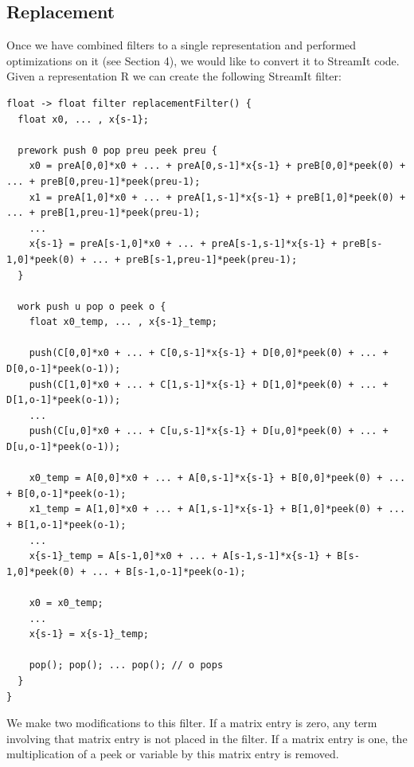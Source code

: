 \subsection{Replacement}

    Once we have combined filters to a single representation and
performed optimizations on it (see Section 4), we would like to
convert it to StreamIt code. Given a representation $\mathrm{R}$
we can create the following StreamIt filter:

\begin{scriptsize}
\begin{singlespace}
\begin{verbatim}
float -> float filter replacementFilter() {
  float x0, ... , x{s-1};

  prework push 0 pop preu peek preu {
    x0 = preA[0,0]*x0 + ... + preA[0,s-1]*x{s-1} + preB[0,0]*peek(0) + ... + preB[0,preu-1]*peek(preu-1);
    x1 = preA[1,0]*x0 + ... + preA[1,s-1]*x{s-1} + preB[1,0]*peek(0) + ... + preB[1,preu-1]*peek(preu-1);
    ...
    x{s-1} = preA[s-1,0]*x0 + ... + preA[s-1,s-1]*x{s-1} + preB[s-1,0]*peek(0) + ... + preB[s-1,preu-1]*peek(preu-1);
  }

  work push u pop o peek o {
    float x0_temp, ... , x{s-1}_temp;

    push(C[0,0]*x0 + ... + C[0,s-1]*x{s-1} + D[0,0]*peek(0) + ... + D[0,o-1]*peek(o-1));
    push(C[1,0]*x0 + ... + C[1,s-1]*x{s-1} + D[1,0]*peek(0) + ... + D[1,o-1]*peek(o-1));
    ...
    push(C[u,0]*x0 + ... + C[u,s-1]*x{s-1} + D[u,0]*peek(0) + ... + D[u,o-1]*peek(o-1));

    x0_temp = A[0,0]*x0 + ... + A[0,s-1]*x{s-1} + B[0,0]*peek(0) + ... + B[0,o-1]*peek(o-1);
    x1_temp = A[1,0]*x0 + ... + A[1,s-1]*x{s-1} + B[1,0]*peek(0) + ... + B[1,o-1]*peek(o-1);
    ...
    x{s-1}_temp = A[s-1,0]*x0 + ... + A[s-1,s-1]*x{s-1} + B[s-1,0]*peek(0) + ... + B[s-1,o-1]*peek(o-1);

    x0 = x0_temp;
    ...
    x{s-1} = x{s-1}_temp;

    pop(); pop(); ... pop(); // o pops
  }
}
\end{verbatim}
\end{singlespace}
\end{scriptsize}

    We make two modifications to this filter. If a matrix entry is
zero, any term involving that matrix entry is not placed in the
filter. If a matrix entry is one, the multiplication of a peek or
variable by this matrix entry is removed.
